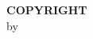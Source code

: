 \thispagestyle{empty}
\doublespacing

\begin{center}
    \large

    \begingroup
    \textbf{COPYRIGHT} \\
    \endgroup
    by \\
    \myName \\

    \myYear
    \vfill
\end{center}
